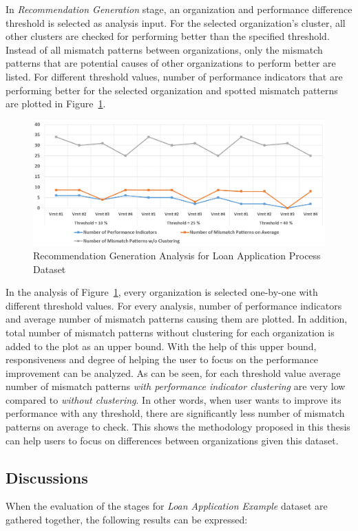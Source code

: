 In \textit{Recommendation Generation} stage, an organization and performance difference threshold is selected as analysis input. For the selected organization's cluster, all other clusters are checked for performing better than the specified threshold. Instead of all mismatch patterns between organizations, only the mismatch patterns that are potential causes of other organizations to perform better are listed. For different threshold values, number of performance indicators that are performing better for the selected organization and spotted mismatch patterns are plotted in Figure~\ref{fig:loan-recommendation-generation-analysis}. 
\begin{figure}
	\centering
	\includegraphics[width=\textwidth]{5_results_discussions/loan-application-process/recommendation-generation-analysis}
	\caption{Recommendation Generation Analysis for Loan Application Process Dataset}
  \label{fig:loan-recommendation-generation-analysis}
\end{figure}

In the analysis of Figure~\ref{fig:loan-recommendation-generation-analysis}, every organization is selected one-by-one with different threshold values. For every analysis, number of performance indicators and average number of mismatch patterns causing them are plotted. In addition, total number of mismatch patterns without clustering for each organization is added to the plot as an upper bound. With the help of this upper bound, responsiveness and degree of helping the user to focus on the performance improvement can be analyzed. As can be seen, for each threshold value average number of mismatch patterns \textit{with performance indicator clustering} are very low compared to \textit{without clustering}. In other words, when user wants to improve its performance with any threshold, there are significantly less number of mismatch patterns on average to check. This shows the methodology proposed in this thesis can help users to focus on differences between organizations given this dataset. 

\subsection{Discussions}
\label{sec:loan-app-discussions}
When the evaluation of the stages for \textit{Loan Application Example} dataset are gathered together, the following results can be expressed:
